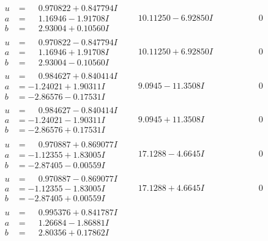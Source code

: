 \documentclass[1p]{elsarticle_modified}
\theoremstyle{definition}
\begin{document}
$$\begin{array}{c|c|c}
\begin{aligned}
u &= \phantom{-}0.970822 + 0.847794 I \\
a &= \phantom{-}1.16946 - 1.91708 I \\
b &= \phantom{-}2.93004 + 0.10560 I\end{aligned}
 & \phantom{-}10.11250 - 6.92850 I & \phantom{-0.000000 } 0 \\ \hline\begin{aligned}
u &= \phantom{-}0.970822 - 0.847794 I \\
a &= \phantom{-}1.16946 + 1.91708 I \\
b &= \phantom{-}2.93004 - 0.10560 I\end{aligned}
 & \phantom{-}10.11250 + 6.92850 I & \phantom{-0.000000 } 0 \\ \hline\begin{aligned}
u &= \phantom{-}0.984627 + 0.840414 I \\
a &= -1.24021 + 1.90311 I \\
b &= -2.86576 - 0.17531 I\end{aligned}
 & \phantom{-}9.0945 - 11.3508 I & \phantom{-0.000000 } 0 \\ \hline\begin{aligned}
u &= \phantom{-}0.984627 - 0.840414 I \\
a &= -1.24021 - 1.90311 I \\
b &= -2.86576 + 0.17531 I\end{aligned}
 & \phantom{-}9.0945 + 11.3508 I & \phantom{-0.000000 } 0 \\ \hline\begin{aligned}
u &= \phantom{-}0.970887 + 0.869077 I \\
a &= -1.12355 + 1.83005 I \\
b &= -2.87405 - 0.00559 I\end{aligned}
 & \phantom{-}17.1288 - 4.6645 I & \phantom{-0.000000 } 0 \\ \hline\begin{aligned}
u &= \phantom{-}0.970887 - 0.869077 I \\
a &= -1.12355 - 1.83005 I \\
b &= -2.87405 + 0.00559 I\end{aligned}
 & \phantom{-}17.1288 + 4.6645 I & \phantom{-0.000000 } 0 \\ \hline\begin{aligned}
u &= \phantom{-}0.995376 + 0.841787 I \\
a &= \phantom{-}1.26684 - 1.86881 I \\
b &= \phantom{-}2.80356 + 0.17862 I\end{aligned}

\end{array}$$
\end{document}
